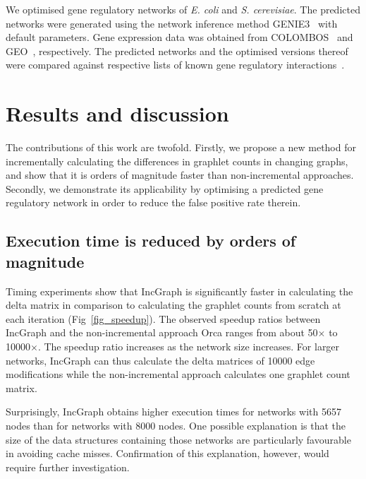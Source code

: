 We optimised gene regulatory networks of \textit{E. coli} and \textit{S. cerevisiae}. The predicted networks were generated using the network inference method GENIE3~\cite{huynh-thu_inferringregulatorynetworks_2010} with default parameters. Gene expression data was obtained from COLOMBOS~\cite{moretto_colombosv3leveraging_2016} and GEO~\cite{edgar_geneexpressionomnibus_2002}, respectively. The predicted networks and the optimised versions thereof were compared against respective lists of known gene regulatory interactions~\cite{gama-castro_regulondbversionhighlevel_2016,ma_denovolearninggenomescale_2014}.

\section*{Results and discussion}
The contributions of this work are twofold. Firstly, we propose a new method for incrementally calculating the differences in graphlet counts in changing graphs, and show that it is orders of magnitude faster than non-incremental approaches. Secondly, we demonstrate its applicability by optimising a predicted gene regulatory network in order to reduce the false positive rate therein.

\subsection*{Execution time is reduced by orders of magnitude}
Timing experiments show that IncGraph is significantly faster in calculating the delta matrix in comparison to calculating the graphlet counts from scratch at each iteration (Fig~\ref{fig_speedup}). The observed speedup ratios between IncGraph and the non-incremental approach Orca ranges from about 50$\times$ to 10000$\times$. The speedup ratio increases as the network size increases. For larger networks, IncGraph can thus calculate the delta matrices of 10000 edge modifications while the non-incremental approach calculates one graphlet count matrix.

Surprisingly, IncGraph obtains higher execution times for networks with 5657 nodes than for networks with 8000 nodes. One possible explanation is that the size of the data structures containing those networks are particularly favourable in avoiding cache misses. Confirmation of this explanation, however, would require further investigation.



